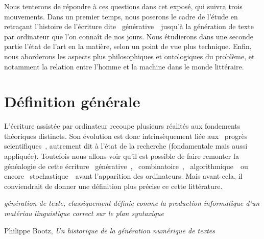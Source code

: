 \documentclass{article}
\newenvironment{citationbox}
{\begin{center}
		\begin{minipage}{.8\textwidth}
		}
		{
		\end{minipage}	
\end{center}
}
\begin{document}
		Nous tenterons de répondre à ces questions dans cet exposé, qui suivra trois mouvements. Dans un premier temps, nous poserons le cadre de l'étude en retraçant l'histoire de l'écriture dite \guillemotleft~générative~\guillemotright~jusqu'à la génération de texte par ordinateur que l'on connaît de nos jours. Nous étudierons dans une seconde partie l'état de l'art en la matière, selon un point de vue plus technique. Enfin, nous aborderons les aspects plus philosophiques et ontologiques du problème, et notamment la relation entre l'homme et la machine dans le monde littéraire.
		
		\section*{Définition générale}
			L'écriture assistée par ordinateur recoupe plusieurs réalités aux fondements théoriques distincts. Son évolution est donc intrinsèquement liée aux \guillemotleft~progrès scientifiques~\guillemotright, autrement dit à l'état de la recherche (fondamentale mais aussi appliquée). Toutefois nous allons voir qu'il est possible de faire remonter la généalogie de cette écriture \guillemotleft~générative~\guillemotright, \guillemotleft~combinatoire~\guillemotright, \guillemotleft~algorithmique~\guillemotright~ou encore \guillemotleft~stochastique~\guillemotright~avant l'apparition des ordinateurs. Mais avant cela, il conviendrait de donner une définition plus précise ce cette littérature.
			\begin{citationbox}
				\textit{génération de texte, classiquement définie comme la production informatique d'un matériau linguistique correct sur le plan syntaxique}
				\begin{flushright}
					Philippe Bootz, \textit{Un historique de la génération numérique de textes} \autocite{bootz}
				\end{flushright}
			\end{citationbox}
				
\end{document}
